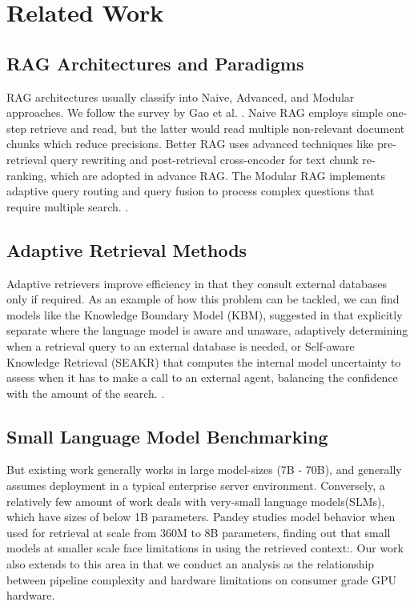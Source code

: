 \documentclass[conference]{IEEEtran}
\begin{document}
\section{Related Work}
\subsection{RAG Architectures and Paradigms}
RAG architectures usually classify into Naive, Advanced, and Modular approaches. We follow the survey by Gao et al.
\cite{gao2023retrieval}. Naive RAG employs simple one-step retrieve and read, but the latter would read multiple non-relevant document chunks which reduce precisions. Better RAG uses advanced techniques like pre-retrieval query rewriting and post-retrieval cross-encoder for text chunk re-ranking, which are adopted in advance RAG. The Modular RAG implements adaptive query routing and query fusion to process complex questions that require multiple search.
\cite{jeong2024adaptive}.
\subsection{Adaptive Retrieval Methods}
Adaptive retrievers improve efficiency in that they consult external databases only if required. As an example of how this problem can be tackled, we can find models like the Knowledge Boundary Model (KBM), suggested in \cite{zhang2024kbm} that explicitly separate where the language model is aware and unaware, adaptively determining when a retrieval query to an external database is needed, or Self-aware Knowledge Retrieval (SEAKR) that computes the internal model uncertainty to assess when it has to make a call to an external agent, balancing the confidence with the amount of the search. \cite{yao2024seakr}.
\subsection{Small Language Model Benchmarking}
But existing work generally works in large model-sizes (7B - 70B), and generally assumes deployment in a typical enterprise server environment. Conversely, a relatively few amount of work deals with very-small language models(SLMs), which have sizes of below 1B parameters. Pandey studies model behavior when used for retrieval at scale from 360M to 8B parameters, finding out that small models at smaller scale face limitations in using the retrieved context:\cite{pandey2026empirical}. Our work also extends to this area in that we conduct an analysis as the relationship between pipeline complexity and hardware limitations on consumer grade GPU hardware.
\end{document}
